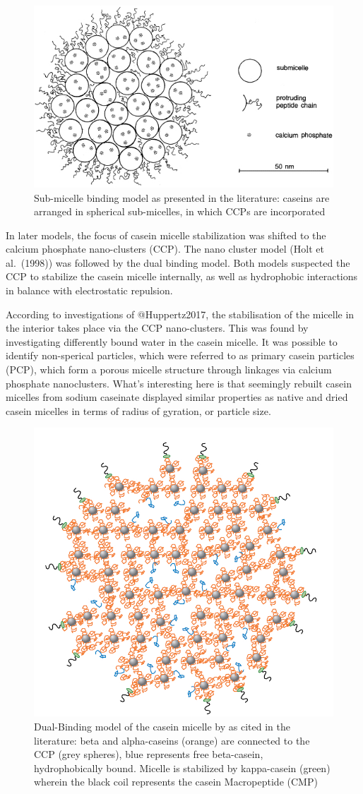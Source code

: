 \documentclass[
]{article}
\begin{document}
\begin{figure}
\includegraphics[width=0.5\linewidth]{images/micelle_Walstra} \caption[sub-micellar binding model of the casein micelle]{Sub-micelle binding model as presented in the literature:  caseins are arranged in spherical sub-micelles, in which CCPs are incorporated}\label{fig:sub-m}
\end{figure}

In later models, the focus of casein micelle stabilization was shifted
to the calcium phosphate nano-clusters (CCP). The nano cluster model
(Holt et al.~(1998)) was followed by the dual binding model. Both models
suspected the CCP to stabilize the casein micelle internally, as well as
hydrophobic interactions in balance with electrostatic repulsion.

According to investigations of @Huppertz2017, the stabilisation of the
micelle in the interior takes place via the CCP nano-clusters. This was
found by investigating differently bound water in the casein micelle. It
was possible to identify non-sperical particles, which were referred to
as primary casein particles (PCP), which form a porous micelle structure
through linkages via calcium phosphate nanoclusters. What's interesting
here is that seemingly rebuilt casein micelles from sodium caseinate
displayed similar properties as native and dried casein micelles in
terms of radius of gyration, or particle size.

\begin{figure}
\includegraphics[width=0.5\linewidth]{images/micelle_Dalgleish} \caption{Dual-Binding model of the casein micelle by as cited in the literature: beta and alpha-caseins (orange) are connected to the CCP (grey spheres), blue represents free beta-casein, hydrophobically bound. Micelle is stabilized by kappa-casein (green) wherein the black coil represents the casein Macropeptide (CMP) }\label{fig:dual-b}
\end{figure}
\end{document}
